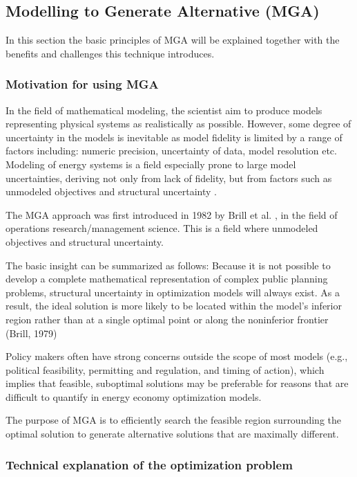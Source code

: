 \subsection{Modelling to Generate Alternative (MGA)}\label{sec:MGA}
In this section the basic principles of MGA will be explained together with the benefits and challenges this technique introduces. 

\subsubsection{Motivation for using MGA}

In the field of mathematical modeling, the scientist aim to produce models representing physical systems as realistically as possible. However, some degree of uncertainty in the models is inevitable as model fidelity is limited by a range of factors including: numeric precision, uncertainty of data, model resolution etc. Modeling of energy systems is a field especially prone to large model uncertainties, deriving not only from lack of fidelity, but from factors such as unmodeled objectives and structural uncertainty \cite{DeCarolis_MGA}. 

The MGA approach was first introduced in 1982 by Brill et al. \cite{Brill_MGA_1982}, in the field of operations research/management science. This is a field where unmodeled objectives and structural uncertainty. 


The basic insight can be
summarized as follows: Because it is not possible to develop a complete
mathematical representation of complex public planning problems,
structural uncertainty in optimization models will always exist. As a
result, the ideal solution is more likely to be located within the model's
inferior region rather than at a single optimal point or along the noninferior frontier (Brill, 1979)

Policy makers often have strong concerns outside the scope of most models
(e.g., political feasibility, permitting and regulation, and timing of
action), which implies that feasible, suboptimal solutions may be
preferable for reasons that are difficult to quantify in energy economy
optimization models.

The purpose of MGA is to efficiently search the feasible
region surrounding the optimal solution to generate alternative
solutions that are maximally different. 

\subsubsection{Technical explanation of the optimization problem}


